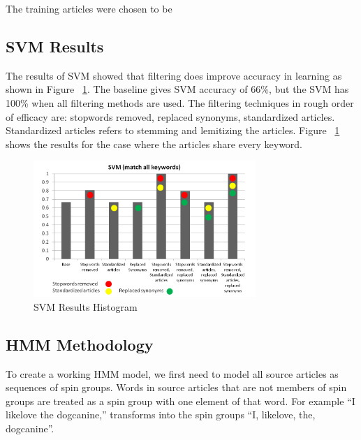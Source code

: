 \documentclass[11pt,letterpaper,oneside, titlepage]{scrartcl}
\begin{document}
The training articles were chosen to be 

\subsection{SVM Results}


The results of SVM showed that filtering does improve accuracy in learning as shown in Figure ~\ref{fig:svm}. The baseline gives SVM accuracy of 66\%, but the SVM has 100\% when all filtering methods are used. The filtering techniques in rough order of efficacy are: stopwords removed, replaced synonyms, standardized articles. Standardized articles refers to stemming and lemitizing the articles. Figure ~\ref{fig:svm} shows the results for the case where the articles share every keyword.


\begin{figure}[h!]
  \centering
  \includegraphics[width=0.75\textwidth]{svm_allmatches}
  \caption{SVM Results Histogram}
  \label{fig:svm}
\end{figure}

\clearpage

\subsection{HMM Methodology}

To create a working HMM model, we first need to model all source articles as sequences of spin groups. Words in source articles that are not members of spin groups are treated as a spin group with one element of that word. For example “I {like\textbar love} the {dog\textbar canine},” transforms into the spin groups “{I}, {like\textbar love}, {the}, {dog\textbar canine}”.
\end{document}
